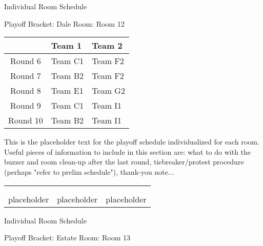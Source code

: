 \documentclass{article}%
\begin{document}
\newpage%
\begin{center}%
\begin{Huge}%
Individual Room Schedule%
\end{Huge}%
\vspace*{16pt}%
\linebreak%
\begin{Large}%
Playoff Bracket: Dale \hfill Room: Room 12%
\end{Large}%
\end{center}%
%
\begin{tabularx}{\textwidth}{|c|Y|Y|}%
\hline%
&Team 1&Team 2\\%
\hline%
Round 6&Team C1&Team F2\\%
Round 7&Team B2&Team F2\\%
Round 8&Team E1&Team G2\\%
Round 9&Team C1&Team I1\\%
Round 10&Team B2&Team I1\\%
\hline%
\end{tabularx}%
\vspace*{16pt}%
\linebreak%
This is the placeholder text for the playoff schedule individualized for each room. Useful pieces of information to include in this section are: what to do with the buzzer and room clean{-}up after the last round, tiebreaker/protest procedure (perhaps "refer to prelim schedule"), thank{-}you note...%
\vspace*{30pt}%
\newline%
%
\begin{tabularx}{\textwidth}{YYY}%
  &  &  \\%
\\%
placeholder&placeholder&placeholder\\%
\end{tabularx}%
\newpage%
\begin{center}%
\begin{Huge}%
Individual Room Schedule%
\end{Huge}%
\vspace*{16pt}%
\linebreak%
\begin{Large}%
Playoff Bracket: Estate \hfill Room: Room 13%
\end{Large}%
\end{center}%
\end{document}
